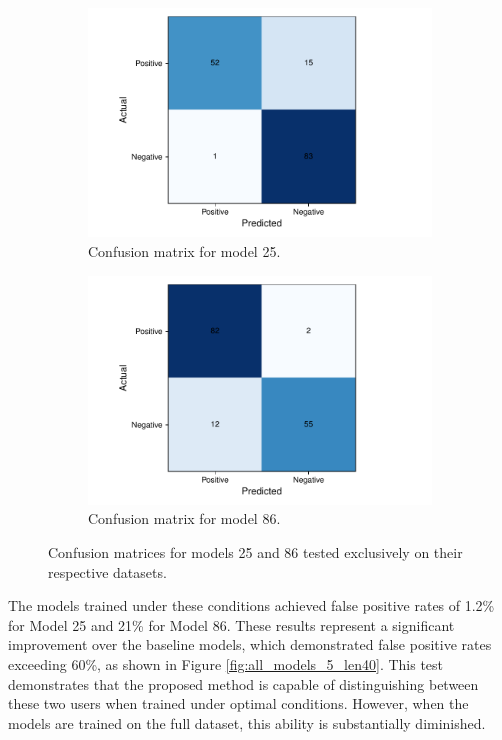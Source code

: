 \begin{figure}[H]
	\centering
	\begin{subfigure}{.5\textwidth}
		\centering
		\includegraphics[width=.99\textwidth]{images/confusion_matrix_25.pdf}
		\caption{Confusion matrix for model 25.}
		\label{fig:sub1}
	\end{subfigure}%
	\begin{subfigure}{.5\textwidth}
		\centering
		\includegraphics[width=.99\textwidth]{images/confusion_matrix_86.pdf}
		\caption{Confusion matrix for model 86.}
		\label{fig:sub2}
	\end{subfigure}
	\caption{Confusion matrices for models 25 and 86 tested exclusively on their respective datasets.}
	\label{user_vs_user}
\end{figure}

The models trained under these conditions achieved false positive rates of 1.2\% for Model 25 and 21\% for Model 86. These results represent a significant improvement over the baseline models, which demonstrated false positive rates exceeding 60\%, as shown in Figure \ref{fig:all_models_5_len40}.
This test demonstrates that the proposed method is capable of distinguishing between these two users when trained under optimal conditions. However, when the models are trained on the full dataset, this ability is substantially diminished.